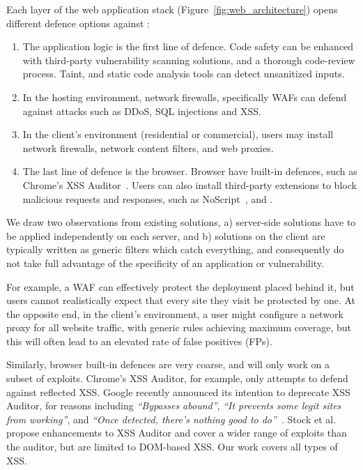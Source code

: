 Each layer of the web application stack  (Figure~\ref{fig:web_architecture}) opens different defence options against \xss:
\begin{enumerate}

\item The application logic is the first line of defence.
  Code safety can be enhanced with third-party vulnerability scanning solutions, and a thorough
  code-review process. Taint, and static code analysis tools can detect unsanitized inputs.

\item In the hosting environment, network firewalls, specifically \acp{WAF} can defend against attacks such as \ac{DDoS}, \ac{SQL} injections and \ac{XSS}.

\item In the client's environment (residential or commercial), users may install network firewalls, network content filters, and web proxies.

\item The last line of defence is the browser.
  Browser have built-in defences, such as
  Chrome's \ac{XSS} Auditor~\cite{xssauditor}. Users can also
  install third-party extensions to block malicious requests and
  responses, such as NoScript~\cite{Noscript}, and \sys.
\end{enumerate}

We draw two observations from existing solutions, a) server-side
solutions have to be applied independently on each server, and b)
solutions on the client are typically written as generic filters which
catch everything, and consequently do not take full advantage
of the specificity of an application or vulnerability.

For example, a \ac{WAF} can effectively protect the deployment placed
behind it, but users cannot realistically expect that every site they
visit be protected by one. At the opposite end, in the client's
environment, a user might configure a network proxy for all website
traffic, with generic rules achieving maximum coverage, but this
will often lead to an elevated rate of false positives (FPs).

Similarly, browser built-in defences are very coarse, and will only
work on a subset of exploits. Chrome's XSS Auditor, for example, only
attempts to defend against reflected \ac{XSS}. Google recently
announced its intention to deprecate XSS Auditor, for reasons
including \emph{``Bypasses abound''}, \emph{``It prevents some legit
  sites from working''}, and \emph{``Once detected, there's nothing
  good to do''}~\cite{deprecatexssauditor}. Stock et
al.~\cite{precise_dom_xss} propose enhancements to XSS Auditor and
cover a wider range of exploits than the auditor, but are limited to
DOM-based \ac{XSS}.  Our work covers all types of \ac{XSS}.


